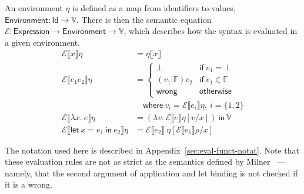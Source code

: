 An environment $\eta$ is defined as a map from identifiers to values,
${\mathsf{Environment} : \mathsf{Id} \rightarrow \mathbb{V}}$.
There is then the semantic equation
${\mathcal{E} : \mathsf{Expression} \rightarrow \mathsf{Environment} \rightarrow
\mathbb{V}}$, which describes how the syntax is evaluated in a given
environment.
\begin{align*}
  \mathcal{E} \llbracket x \rrbracket \eta
  &= \eta \llbracket x \rrbracket \\
  \mathcal{E} \llbracket e_1 e_2 \rrbracket \eta
  &=
    \begin{cases}
      \bot & \mathsf{if} \ v_1 = \bot \\
      (v_1 | \mathbb{F}) v_2 & \mathsf{if} \ v_1 \in \mathbb{F} \\
      \mathsf{wrong} & \mathsf{otherwise}
    \end{cases}
  \\
  & \quad \textsf{where} \ v_i = \mathcal{E} \llbracket e_i \rrbracket \eta , \ i = \{
    1, 2\} \\
  \mathcal{E} \llbracket \lambda x . \ e \rrbracket \eta
  &=
    (\lambda v . \ \mathcal{E} \llbracket e \rrbracket \eta [v / x ])
    \ \mathsf{in} \ \mathbb{V} \\
  \mathcal{E} \llbracket \textsf{let} \ x = e_1 \ \textsf{in} \ e_2 \rrbracket \eta
  &=
    \mathcal{E} \llbracket e_2 \rrbracket \ \eta [ \mathcal{E} \llbracket e_1 \rrbracket\rho / x ]
\end{align*}

The notation used here is described in Appendix~\ref{sec:eval-funct-notat}.
Note that these evaluation rules are not as strict as the semantics
defined by Milner~\cite{milner1978} --- namely, that the second argument
of application and let binding is not checked if it is a
\textsf{wrong}.





